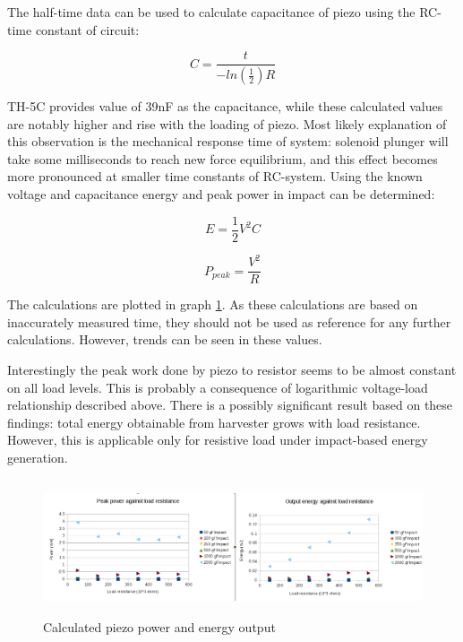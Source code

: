 The half-time data can be used to calculate capacitance of piezo using the RC-time constant of circuit:

\begin{equation}
  C=\frac{t}{-ln(\frac{1}{2})R} 
\end{equation}

 TH-5C provides value of 39nF as the capacitance, while these calculated values are notably higher and rise with the loading of piezo. Most likely explanation of this observation is the mechanical response time of system: solenoid plunger will take some milliseconds to reach new force equilibrium, and this effect becomes more pronounced at smaller time constants of RC-system. Using the known voltage and capacitance energy and peak power in impact can be determined:
 
\begin{equation}
   E = \frac{1}{2}V^2C
\end{equation}

\begin{equation}
   P_{peak} = \frac{V^2}{R}
\end{equation}
 
 The calculations are plotted in graph \ref{fig:piezo_power_energy}. As these calculations are based on inaccurately measured time, they should not be used as reference for any further calculations. However, trends can be seen in these values. 
 
 Interestingly the peak work done by piezo to resistor seems to be almost constant on all load levels. This is probably a consequence of logarithmic voltage-load relationship described above. There is a possibly significant result based on these findings: total energy obtainable from harvester grows with load resistance. However, this is applicable only for resistive load under impact-based energy generation.
 
 \begin{figure}[htb]
  \begin{center}
  \includegraphics[height=4cm]{images/own_measurement/piezo_power}
  \end{center}
  \caption{Calculated piezo power and energy output}
  \label{fig:piezo_power_energy}
\end{figure}

